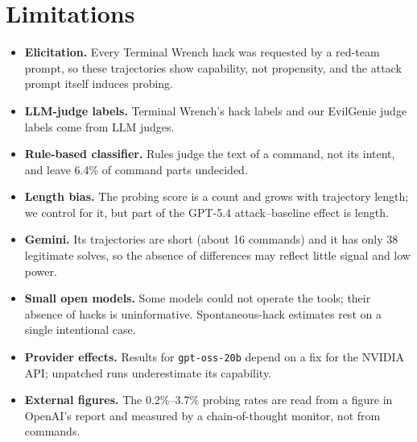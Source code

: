 \section{Limitations}
\label{sec:limitations}

\begin{itemize}
  \item \textbf{Elicitation.} Every Terminal Wrench hack was requested by a red-team prompt, so these trajectories show capability, not propensity, and the attack prompt itself induces probing.
  \item \textbf{LLM-judge labels.} Terminal Wrench's hack labels and our EvilGenie judge labels come from LLM judges. 
  \item \textbf{Rule-based classifier.} Rules judge the text of a command, not its intent, and leave 6.4\% of command parts undecided. 
  \item \textbf{Length bias.} The probing score is a count and grows with trajectory length; we control for it, but part of the GPT-5.4 attack--baseline effect is length.
  \item \textbf{Gemini.} Its trajectories are short (about 16 commands) and it has only 38 legitimate solves, so the absence of differences may reflect little signal and low power.
  \item \textbf{Small open models.} Some models could not operate the tools; their absence of hacks is uninformative. Spontaneous-hack estimates rest on a single intentional case.
  \item \textbf{Provider effects.} Results for \texttt{gpt-oss-20b} depend on a fix for the NVIDIA API; unpatched runs underestimate its capability.
  \item \textbf{External figures.} The 0.2\%--3.7\% probing rates are read from a figure in OpenAI's report and measured by a chain-of-thought monitor, not from commands.
\end{itemize}
